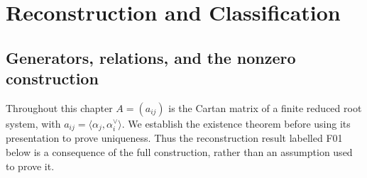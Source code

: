 \chapter{Reconstruction and Classification}
\label{ch:classification}

\section{Generators, relations, and the nonzero construction}

Throughout this chapter \(A=(a_{ij})\) is the Cartan matrix of
a finite reduced root system, with
\(a_{ij}=\langle\alpha_j,\alpha_i^\vee\rangle\).
We establish the existence theorem before using its presentation
to prove uniqueness. Thus the reconstruction result labelled F01
below is a consequence of the full construction, rather than an
assumption used to prove it.

